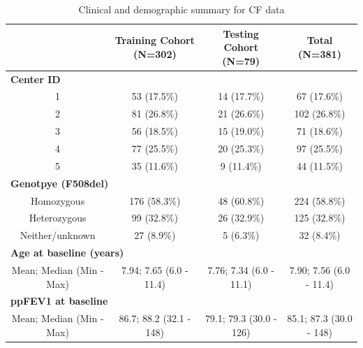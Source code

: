 \begin{center}
\begin{table}[H]
\caption{Clinical and demographic summary for CF data}
 \small
  \begin{tabular}{cccc}
    \toprule
 & Training Cohort (N=302) & Testing Cohort (N=79) & Total (N=381)\\
 \midrule 
   \multicolumn{4}{l}{\bf Center ID} \\
   \hline
   1 & 53 (17.5\%) & 14 (17.7\%) & 67 (17.6\%) \\
   2 & 81 (26.8\%) & 21 (26.6\%) & 102 (26.8\%) \\
   3 & 56 (18.5\%) & 15 (19.0\%) & 71 (18.6\%) \\
   4 & 77 (25.5\%) & 20 (25.3\%) & 97 (25.5\%) \\
   5 & 35 (11.6\%) & 9 (11.4\%) & 44 (11.5\%)\\
    \hline
   \multicolumn{4}{l}{\bf Genotpye (F508del)}\\
    \hline
   Homozygous & 176 (58.3\%) & 48 (60.8\%) & 224 (58.8\%) \\
   Heterozygous & 99 (32.8\%) & 26 (32.9\%) & 125 (32.8\%) \\
   Neither/unknown & 27 (8.9\%) & 5 (6.3\%) & 32 (8.4\%) \\
    \hline
 \multicolumn{4}{l}{\bf Age at baseline (years)}\\
  
 Mean; Median (Min - Max) & 7.94; 7.65 (6.0 - 11.4) & 7.76; 7.34 (6.0 - 11.1) & 7.90; 7.56 (6.0 - 11.4) \\
  
   \multicolumn{4}{l}{\bf ppFEV1 at baseline}\\
  
  Mean; Median (Min - Max) & 86.7; 88.2 (32.1 - 148) & 79.1; 79.3 (30.0 - 126) & 85.1; 87.3 (30.0 - 148) \\


\end{tabular}
\end{table}
\end{center}

